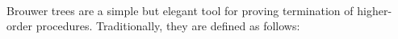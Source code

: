 \begin{code}[hide]%
\>[0]\AgdaSpace{}%
\AgdaSpace{}%
\<%
\\
\>[0]\AgdaSpace{}%
\AgdaSpace{}%
\<%
\end{code}


Brouwer trees  are a simple but elegant tool for proving termination of higher-order procedures.
Traditionally, they are defined as follows:
\begin{code}%
\>[0]\AgdaSpace{}%
\AgdaSpace{}%
\AgdaSymbol{:}\AgdaSpace{}%
\AgdaSpace{}%
\<%
\\
\>[0][@{}l@{\AgdaIndent{0}}]%
\>[4]\AgdaSpace{}%
\AgdaSymbol{:}\AgdaSpace{}%
\<%
\\
%
\>[4]\AgdaSpace{}%
\AgdaSymbol{:}\AgdaSpace{}%
\AgdaSpace{}%
\AgdaSpace{}%
\<%
\\
%
\>[4]\AgdaSpace{}%
\AgdaSymbol{:}\AgdaSpace{}%
\AgdaSymbol{(}\AgdaSpace{}%
\AgdaSpace{}%
\AgdaSymbol{)}\AgdaSpace{}%
\AgdaSpace{}%
\<%
\end{code}
